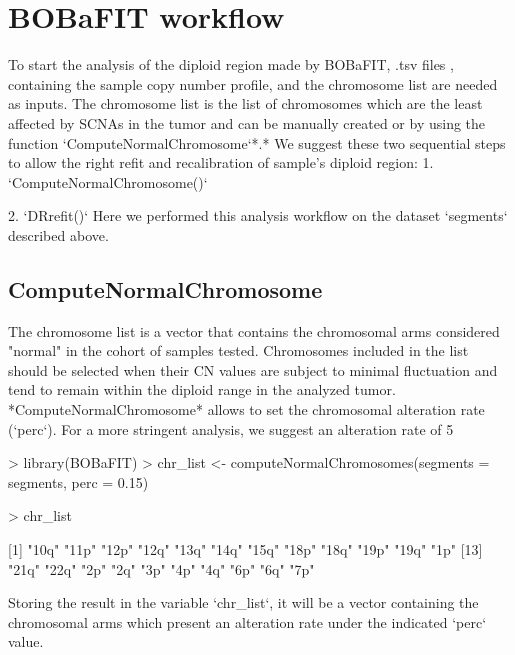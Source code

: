 \documentclass{article}
\begin{document}
\section{BOBaFIT workflow}
To start the analysis of the diploid region made by BOBaFIT, .tsv files , containing the sample copy number profile, and the chromosome list are needed as inputs. The chromosome list is the list of chromosomes which are the least affected by SCNAs in the tumor and can be manually created or by using the function `ComputeNormalChromosome`*.* We suggest these two sequential steps to allow the right refit and recalibration of sample's diploid region:
1.  `ComputeNormalChromosome()`

2.  `DRrefit()`
Here we performed this analysis workflow on the dataset `segments` described above.

\subsection*{ComputeNormalChromosome}
The chromosome list is a vector that contains the chromosomal arms considered "normal" in the cohort of samples tested. Chromosomes included in the list should be selected when their CN values are subject to minimal fluctuation and tend to remain within the diploid range in the analyzed tumor. *ComputeNormalChromosome* allows to set the chromosomal alteration rate (`perc`). For a more stringent analysis, we suggest an alteration rate of 5%

\begin{Schunk}
\begin{Sinput}
> library(BOBaFIT)
> chr_list <- computeNormalChromosomes(segments = segments, perc = 0.15)
\end{Sinput}
\end{Schunk}
\begin{Schunk}
\begin{Sinput}
> chr_list
\end{Sinput}
 [1] "10q" "11p" "12p" "12q" "13q" "14q" "15q" "18p" "18q" "19p" "19q" "1p" 
[13] "21q" "22q" "2p"  "2q"  "3p"  "4p"  "4q"  "6p"  "6q"  "7p" \end{Schunk}

Storing the result in the variable `chr_list`, it will be a vector containing the chromosomal arms which present an alteration rate under the indicated `perc` value.
\end{document}
